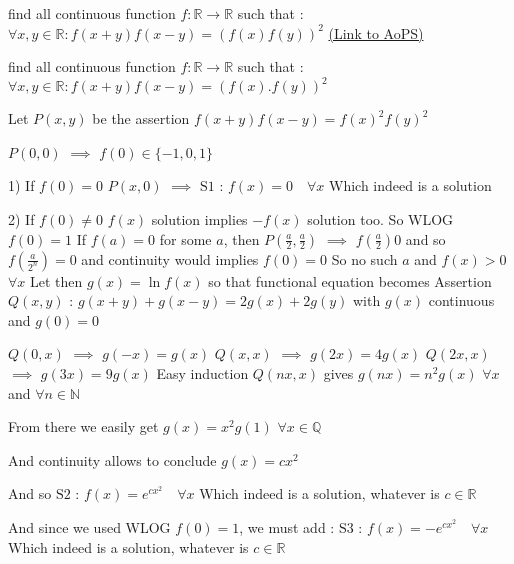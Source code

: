 \begin{problem}
	find all continuous function  $f: \mathbb{R}\to\mathbb{R}$ such that :
$\forall x,y\in\mathbb{R}:f(x+y)f(x-y)=(f(x)f(y))^2$
	\flushright \href{https://artofproblemsolving.com/community/c6h1621877}{(Link to AoPS)}
\end{problem}



\begin{solution}
	\begin{tcolorbox}find all continuous function  $f: \mathbb{R}\to\mathbb{R}$ such that :
$\forall x,y\in\mathbb{R}:f(x+y)f(x-y)=(f(x).f(y))^2$\end{tcolorbox}
Let $P(x,y)$ be the assertion $f(x+y)f(x-y)=f(x)^2f(y)^2$

$P(0,0)$ $\implies$ $f(0)\in\{-1,0,1\}$

1) If $f(0)=0$
$P(x,0)$ $\implies$ $\boxed{\text{S1 : }f(x)=0\quad\forall x}$
Which indeed is a solution

2) If $f(0)\ne 0$
$f(x)$ solution implies $-f(x)$ solution too. So WLOG $f(0)=1$
If $f(a)=0$ for some $a$, then 
$P(\frac a2,\frac a2)$ $\implies$ $f(\frac a2)0$ and so $f(\frac a{2^n})=0$ and continuity would implies $f(0)=0$
So no such $a$ and $f(x)>0$ $\forall x$
Let then $g(x)=\ln f(x)$ so that functional equation becomes 
Assertion $Q(x,y)$ : $g(x+y)+g(x-y)=2g(x)+2g(y)$ with $g(x)$ continuous and $g(0)=0$

$Q(0,x)$ $\implies$ $g(-x)=g(x)$
$Q(x,x)$ $\implies$ $g(2x)=4g(x)$
$Q(2x,x)$ $\implies$ $g(3x)=9g(x)$
Easy induction $Q(nx,x)$ gives $g(nx)=n^2g(x)$ $\forall x$ and $\forall n\in\mathbb N$

From there we easily get $g(x)=x^2g(1)$ $\forall x\in\mathbb Q$

And continuity allows to conclude $g(x)=cx^2$

And so $\boxed{\text{S2 : }f(x)=e^{cx^2}\quad\forall x}$
Which indeed is a solution, whatever is $c\in\mathbb R$

And since we used WLOG $f(0)=1$, we must add :
$\boxed{\text{S3 : }f(x)=-e^{cx^2}\quad\forall x}$
Which indeed is a solution, whatever is $c\in\mathbb R$





\end{solution}



